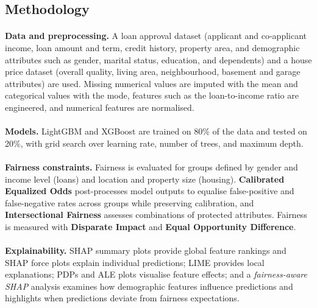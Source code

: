 \documentclass[12pt,a4paper,final]{extreport}
\begin{document}
\subsection{Methodology}

\paragraph{} \textbf{Data and preprocessing.} A loan approval dataset (applicant and co-applicant income, loan amount and term, credit history, property area, and demographic attributes such as gender, marital status, education, and dependents) and a house price dataset (overall quality, living area, neighbourhood, basement and garage attributes) are used. Missing numerical values are imputed with the mean and categorical values with the mode, features such as the loan-to-income ratio are engineered, and numerical features are normalised.

\paragraph{} \textbf{Models.} LightGBM and XGBoost are trained on 80\% of the data and tested on 20\%, with grid search over learning rate, number of trees, and maximum depth.

\paragraph{} \textbf{Fairness constraints.} Fairness is evaluated for groups defined by gender and income level (loans) and location and property size (housing). \textbf{Calibrated Equalized Odds} post-processes model outputs to equalise false-positive and false-negative rates across groups while preserving calibration, and \textbf{Intersectional Fairness} assesses combinations of protected attributes. Fairness is measured with \textbf{Disparate Impact} and \textbf{Equal Opportunity Difference}.

\paragraph{} \textbf{Explainability.} SHAP summary plots provide global feature rankings and SHAP force plots explain individual predictions; LIME provides local explanations; PDPs and ALE plots visualise feature effects; and a \emph{fairness-aware SHAP} analysis examines how demographic features influence predictions and highlights when predictions deviate from fairness expectations.
\end{document}
